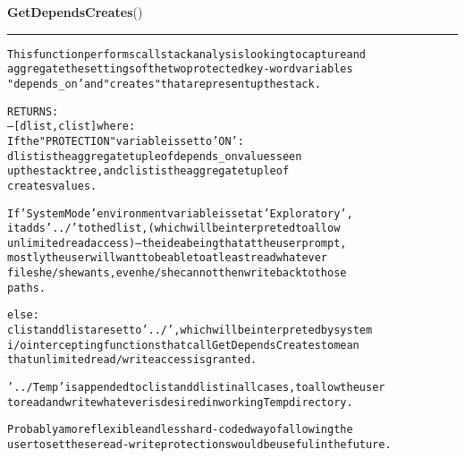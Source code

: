 \hspace{.8\funcindent}\begin{boxedminipage}{\funcwidth}

    \raggedright \textbf{GetDependsCreates}()

    \vspace{-1.5ex}

    \rule{\textwidth}{0.5\fboxrule}
\setlength{\parskip}{2ex}
\begin{alltt}

This function performs call stack analysis looking to capture and 
aggregate the settings of the two protected key-word variables 
"depends\_on' and "creates" that are present up the stack. 

RETURNS:
--[dlist,clist] where:
If the "PROTECTION" variable is set to 'ON':
        dlist is the aggregate tuple of depends\_on values seen 
        up the stack tree, and clist is the aggregate tuple of 
        creates values. 
        
        If 'SystemMode' environment variable is set at 'Exploratory', 
        it adds '../' to the dlist, (which will be interpreted to allow
        unlimited read access) -- the idea being that at the user prompt, 
        mostly the user will want to be able to at least read whatever 
        files he/she wants, even he/she cannot then write back to those
        paths.   
        
else:
        clist and dlist are set to '../', which will be interpreted by system 
        i/o intercepting functions that call GetDependsCreates to mean 
        that unlimited read/write access is granted. 
        
'../Temp' is appended to clist and dlist in all cases, to allow the user 
to read and write whatever is desired in working Temp directory. 
        
Probably a more flexible and less hard-coded way of allowing the
user to set these read-write protections would be useful in the future.
\end{alltt}

\setlength{\parskip}{1ex}
    \end{boxedminipage}

    \label{System:system_io_override:system_open}

    \vspace{0.5ex}

